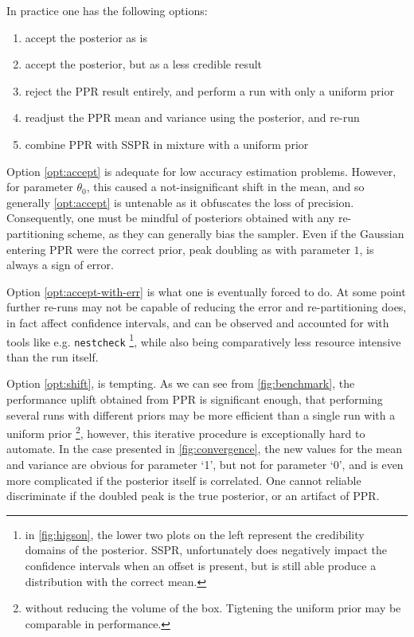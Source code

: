 \documentclass[usenatbib]{mnras}
\begin{document}
In practice one has the following options:
\begin{enumerate}
\item accept the posterior as is \label{opt:accept}
\item accept the posterior, but as a less credible result
\label{opt:accept-with-err}
\item reject the PPR result entirely, and perform a run with only a
uniform prior \label{opt:uniform}
\item readjust the PPR mean and variance using the posterior, and
re-run \label{opt:shift}
\item combine PPR with SSPR in mixture with a uniform prior
\end{enumerate}
Option \ref{opt:accept} is adequate for low accuracy estimation
problems. However, for parameter \(\theta_{0}\), this caused a
not-insignificant shift in the mean, and so generally \ref{opt:accept}
is untenable as it obfuscates the loss of precision. Consequently,
one must be mindful of posteriors obtained with any re-partitioning
scheme, as they can generally bias the sampler. Even if the Gaussian
entering PPR were the correct prior, peak doubling as with parameter
\(1\), is always a sign of error. 

Option \ref{opt:accept-with-err} is what one is eventually forced to
do. At some point further re-runs may not be capable of reducing the
error and re-partitioning does, in fact affect confidence intervals,
and can be observed and accounted for with tools like
e.g. \texttt{nestcheck} \footnote{in \autoref{fig:higson}, the lower two plots on
the left represent the credibility domains of the posterior. SSPR,
unfortunately does negatively impact the confidence intervals when
an offset is present, but is still able produce a distribution with
the correct mean.}, while also being comparatively less resource
intensive than the run itself.

Option \ref{opt:shift}, is tempting. As we can see from
\autoref{fig:benchmark}, the performance uplift obtained from PPR is
significant enough, that performing several runs with different
priors may be more efficient than a single run with a uniform prior
\footnote{without reducing the volume of the box. Tigtening the uniform
prior may be comparable in performance.}, however, this iterative
procedure is exceptionally hard to automate. In the case presented
in \autoref{fig:convergence}, the new values for the mean and variance
are obvious for parameter `1', but not for parameter `0', and is
even more complicated if the posterior itself is correlated. One
cannot reliable discriminate if the doubled peak is the true
posterior, or an artifact of PPR.
\end{document}
